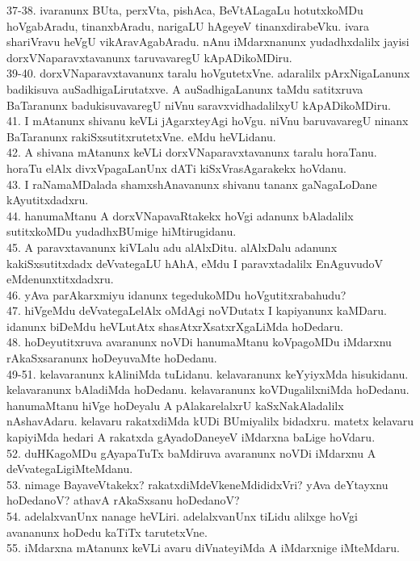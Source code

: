 \documentclass{article}
\begin{document}
37-38. ivaranunx BUta, perxVta, pishAca, BeVtALagaLu hotutxkoMDu hoVgabAradu, tinanxbAradu, narigaLU hAgeyeV tinanxdirabeVku. ivara shariVravu heVgU vikAravAgabAradu. nAnu iMdarxnanunx yudadhxdalilx jayisi dorxVNaparavxtavanunx taruvavaregU kApADikoMDiru.\\
39-40. dorxVNaparavxtavanunx taralu hoVgutetxVne. adaralilx pArxNigaLanunx badikisuva auSadhigaLirutatxve. A auSadhigaLanunx taMdu satitxruva BaTaranunx badukisuvavaregU niVnu saravxvidhadalilxyU kApADikoMDiru.\\
41. I mAtanunx shivanu keVLi jAgarxteyAgi hoVgu. niVnu baruvavaregU ninanx BaTaranunx rakiSxsutitxrutetxVne. eMdu heVLidanu.\\
42. A shivana mAtanunx keVLi dorxVNaparavxtavanunx taralu horaTanu. horaTu elAlx divxVpagaLanUnx dATi kiSxVrasAgarakekx hoVdanu.\\
43. I raNamaMDalada shamxshAnavanunx shivanu tananx gaNagaLoDane kAyutitxdadxru.\\
44. hanumaMtanu A dorxVNapavaRtakekx hoVgi adanunx bAladalilx sutitxkoMDu yudadhxBUmige hiMtirugidanu.\\
45. A paravxtavanunx kiVLalu adu alAlxDitu. alAlxDalu adanunx kakiSxsutitxdadx deVvategaLU hAhA, eMdu I paravxtadalilx EnAguvudoV eMdenunxtitxdadxru.\\
46. yAva parAkarxmiyu idanunx tegedukoMDu hoVgutitxrabahudu?\\
47. hiVgeMdu deVvategaLelAlx oMdAgi noVDutatx I kapiyanunx kaMDaru. idanunx biDeMdu heVLutAtx shasAtxrXsatxrXgaLiMda hoDedaru.\\
48. hoDeyutitxruva avaranunx noVDi hanumaMtanu koVpagoMDu iMdarxnu rAkaSxsaranunx hoDeyuvaMte hoDedanu.\\
49-51. kelavaranunx kAliniMda tuLidanu. kelavaranunx keYyiyxMda hisukidanu. kelavaranunx bAladiMda hoDedanu. kelavaranunx koVDugalilxniMda hoDedanu. hanumaMtanu hiVge hoDeyalu A pAlakarelalxrU kaSxNakAladalilx nAshavAdaru. kelavaru rakatxdiMda kUDi BUmiyalilx bidadxru. matetx kelavaru kapiyiMda hedari A rakatxda gAyadoDaneyeV iMdarxna baLige hoVdaru.\\
52. duHKagoMDu gAyapaTuTx baMdiruva avaranunx noVDi iMdarxnu A deVvategaLigiMteMdanu.\\
53. nimage BayaveVtakekx? rakatxdiMdeVkeneMdididxVri? yAva deYtayxnu hoDedanoV? athavA rAkaSxsanu hoDedanoV?\\
54. adelalxvanUnx nanage heVLiri. adelalxvanUnx tiLidu alilxge hoVgi avananunx hoDedu kaTiTx tarutetxVne.\\
55. iMdarxna mAtanunx keVLi avaru diVnateyiMda A iMdarxnige iMteMdaru.\\
\end{document}
